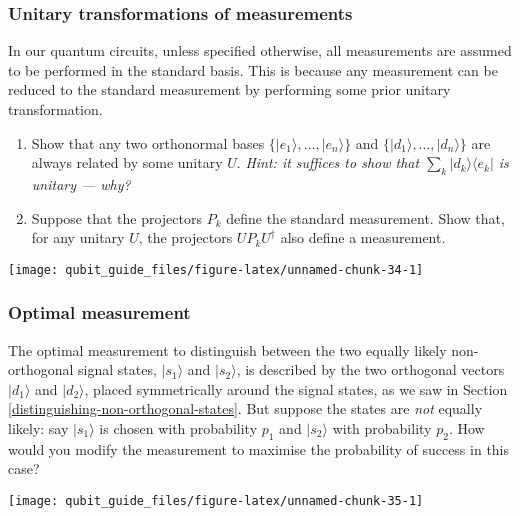 \documentclass[fleqn]{article}
\begin{document}
\hypertarget{unitary-transformations-of-measurements}{%
\subsubsection{Unitary transformations of measurements}\label{unitary-transformations-of-measurements}}

In our quantum circuits, unless specified otherwise, all measurements are assumed to be performed in the standard basis.
This is because any measurement can be reduced to the standard measurement by performing some prior unitary transformation.

\begin{enumerate}
\def\labelenumi{\arabic{enumi}.}
\item
  Show that any two orthonormal bases \(\{|e_1\rangle,\ldots,|e_n\rangle\}\) and \(\{|d_1\rangle,\ldots,|d_n\rangle\}\) are always related by some unitary \(U\).
  \emph{Hint: it suffices to show that \(\sum_k |d_k\rangle\langle e_k|\) is unitary --- why?}
\item
  Suppose that the projectors \(P_k\) define the standard measurement.
  Show that, for any unitary \(U\), the projectors \(UP_kU^\dagger\) also define a measurement.
\end{enumerate}

\begin{center}\texttt{[image: qubit\_guide\_files/figure-latex/unnamed-chunk-34-1]} \end{center}

\hypertarget{optimal-measurement}{%
\subsubsection{Optimal measurement}\label{optimal-measurement}}

The optimal measurement to distinguish between the two equally likely non-orthogonal signal states, \(|s_1\rangle\) and \(|s_2\rangle\), is described by the two orthogonal vectors \(|d_1\rangle\) and \(|d_2\rangle\), placed symmetrically around the signal states, as we saw in Section \ref{distinguishing-non-orthogonal-states}.
But suppose the states are \emph{not} equally likely: say \(|s_1\rangle\) is chosen with probability \(p_1\) and \(|s_2\rangle\) with probability \(p_2\).
How would you modify the measurement to maximise the probability of success in this case?

\begin{center}\texttt{[image: qubit\_guide\_files/figure-latex/unnamed-chunk-35-1]} \end{center}
\end{document}
